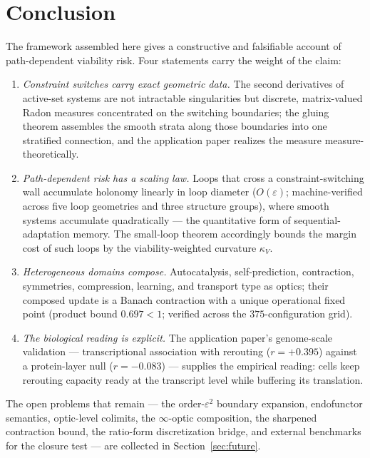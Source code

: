 \documentclass[11pt,a4paper]{article}
\theoremstyle{plain}
\theoremstyle{definition}
\theoremstyle{remark}
\newcommand{\kk}{\kappa_{\!V}}
\begin{document}

\section{Conclusion}\label{sec:conclusion}

The framework assembled here gives a constructive and falsifiable
account of path-dependent viability risk. Four statements carry the
weight of the claim:
\begin{enumerate}[leftmargin=*,itemsep=2pt]
\item \emph{Constraint switches carry exact geometric data.} The
second derivatives of active-set systems are not intractable
singularities but discrete, matrix-valued Radon measures concentrated
on the switching boundaries; the gluing theorem assembles the smooth
strata along those boundaries into one stratified connection, and
the application paper \citep{zai2026measure} realizes the measure
measure-theoretically.
\item \emph{Path-dependent risk has a scaling law.} Loops that cross
a constraint-switching wall accumulate holonomy linearly in loop
diameter ($O(\varepsilon)$; machine-verified across five loop
geometries and three structure groups), where smooth systems
accumulate quadratically --- the quantitative form of sequential-
adaptation memory. The small-loop theorem accordingly bounds the
margin cost of such loops by the viability-weighted curvature $\kk$.
\item \emph{Heterogeneous domains compose.} Autocatalysis,
self-prediction, contraction, symmetries, compression, learning, and
transport type as optics; their composed update is a Banach
contraction with a unique operational fixed point (product bound
$0.697 < 1$; verified across the $375$-configuration grid).
\item \emph{The biological reading is explicit.} The application
paper's genome-scale validation --- transcriptional association with
rerouting ($r = +0.395$) against a protein-layer null
($r = -0.083$) --- supplies the empirical reading: cells keep
rerouting capacity ready at the transcript level while buffering its
translation.
\end{enumerate}
The open problems that remain --- the order-$\varepsilon^2$
boundary expansion, endofunctor semantics, optic-level colimits, the
$\infty$-optic composition, the sharpened contraction bound, the
ratio-form discretization bridge, and external benchmarks for the
closure test --- are collected in Section~\ref{sec:future}.
\end{document}
